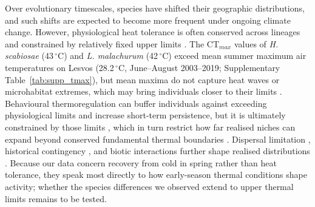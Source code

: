\documentclass[11pt,a4paper]{article}
\begin{document}
Over evolutionary timescales, species have shifted their geographic distributions, and such shifts are expected to become more frequent under ongoing climate change. However, physiological heat tolerance is often conserved across lineages and constrained by relatively fixed upper limits \citep{Araujo2013, Hoffmann2013}. The CT$_{max}$ values of \textit{H. scabiosae} (43\,$^\circ$C) and \textit{L. malachurum} (42\,$^\circ$C) \citep{Gonzalez2024} exceed mean summer maximum air temperatures on Lesvos (28.2\,$^\circ$C, June--August 2003--2019; Supplementary Table~\ref{tab:supp_tmax}), but mean maxima do not capture heat waves or microhabitat extremes, which may bring individuals closer to their limits \citep{Deutsch2008, Huey2009, ClusellaTrullas2011}. Behavioural thermoregulation can buffer individuals against exceeding physiological limits and increase short-term persistence, but it is ultimately constrained by those limits \citep{Huey2003}, which in turn restrict how far realised niches can expand beyond conserved fundamental thermal boundaries \citep{Jackson2000, Kearney2013}. Dispersal limitation \citep{Baselga2012}, historical contingency \citep{Ricklefs2006}, and biotic interactions \citep{Dobzhansky1950} further shape realised distributions \citep{Araujo2013}. Because our data concern recovery from cold in spring rather than heat tolerance, they speak most directly to how early-season thermal conditions shape activity; whether the species differences we observed extend to upper thermal limits remains to be tested.

\end{document}
